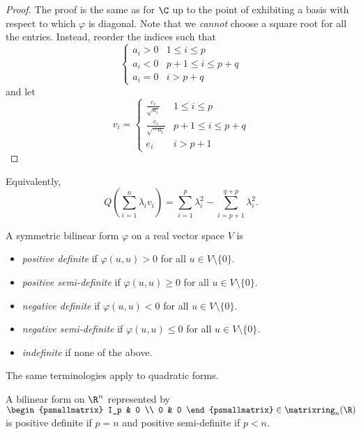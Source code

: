 \documentclass[a4paper]{article}
\newcommand*{\M}{\matrixring}
\theoremstyle{definition}
\begin{document}
\begin{proof}
  The proof is the same as for \(\C\) up to the point of exhibiting a basis with respect to which \(\varphi\) is diagonal. Note that we \emph{cannot} choose a square root for all the entries. Instead, reorder the indices such that
  \[
    \begin{cases}
      a_i > 0 & 1 \leq i \leq p \\
      a_i < 0 & p + 1 \leq i \leq p + q \\
      a_i = 0 & i > p + q
    \end{cases}
  \]
  and let
  \[
    v_i =
    \begin{cases}
      \frac{e_i}{\sqrt{a_i}} & 1 \leq i \leq p \\
      \frac{e_i}{\sqrt{-a_i}} & p + 1 \leq i \leq p + q \\
      e_i & i > p + 1
    \end{cases}
  \]
\end{proof}

Equivalently,
\[
  Q \left( \sum_{i = 1}^{n} \lambda_i v_i \right) = \sum_{i = 1}^{p} \lambda_i^2 - \sum_{i = p + 1}^{q + p} \lambda_i^2.
\]

\begin{definition}
  A symmetric bilinear form \(\varphi\) on a real vector space \(V\) is
  \begin{itemize}
  \item \emph{positive definite} if \(\varphi(u, u) > 0\) for all \(u \in V\setminus \{0\}\).
  \item \emph{positive semi-definite} if \(\varphi(u, u) \geq 0\) for all \(u \in V\setminus \{0\}\).
  \item \emph{negative definite} if \(\varphi(u, u) < 0\) for all \(u \in V\setminus \{0\}\).
  \item \emph{negative semi-definite} if \(\varphi(u, u) \leq 0\) for all \(u \in V\setminus \{0\}\).
  \item \emph{indefinite} if none of the above.
  \end{itemize}
\end{definition}

The same terminologies apply to quadratic forms.

\begin{eg}
  A bilinear form on \(\R^n\) represented by \(\begin{psmallmatrix} I_p & 0 \\ 0 & 0 \end{psmallmatrix} \in \M_n(\R)\) is positive definite if \(p = n\) and positive semi-definite if \(p < n\).
\end{eg}
\end{document}
